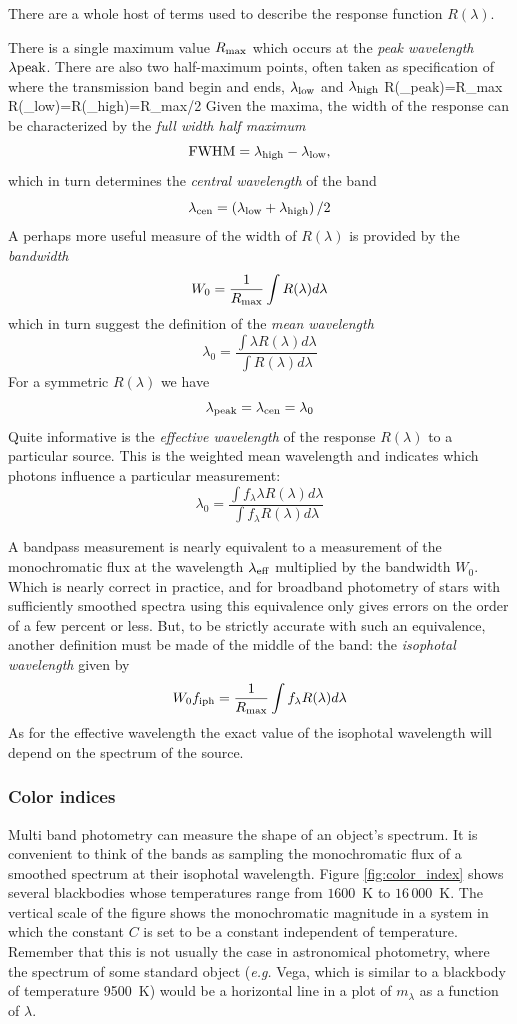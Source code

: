There are a whole host of terms used to describe the response
function $R(\lambda)$. 

There is a single maximum value $R_{\rm max}$  which occurs at the
{\it peak wavelength} $\lambda{\rm peak}$. There are also two
half-maximum points, often taken as specification of where the
transmission band begin and ends, $\lambda_{\rm low}$ and
$\lambda_{\rm high}$
\bua
R(\lambda_{\rm peak})=R_{\rm max} \\
R(\lambda_{\rm low})=R(\lambda_{\rm high})={R_{\rm max}/2}
\eua
Given the maxima, the width of the response can be characterized by
the {\it full width half maximum}
\[
{\rm FWHM}=\lambda_{\rm high}-\lambda_{\rm low},
\]
which in turn determines the {\it central wavelength} of the band
\[
\lambda_{\rm cen}={\left(\lambda_{\rm low}+\lambda_{\rm
      high}\right)/2}
\]
A perhaps more useful measure of the width of $R(\lambda)$ is provided
by the {\it bandwidth}
\[
W_0=\frac{1}{R_{\rm max}}\int R(\lambda)d\lambda
\]
which in turn suggest the definition of the {\it mean wavelength}
\[
\lambda_0=\frac{\int\lambda R(\lambda)d\lambda}{\int
  R(\lambda)d\lambda}
\]
For a symmetric $R(\lambda)$ we have
\[
\lambda_{\rm peak}=\lambda_{\rm cen}=\lambda_0
\]
Quite informative is the {\it effective wavelength} of the response
$R(\lambda)$ to a particular source. This is the weighted mean
wavelength and indicates which photons influence a particular
measurement:
\[
\lambda_0=\frac{\int f_\lambda\lambda R(\lambda)d\lambda}{\int
  f_\lambda R(\lambda)d\lambda}
\]

A bandpass measurement is nearly equivalent to a measurement of the
monochromatic flux at the wavelength $\lambda_{\rm eff}$ multiplied by
the bandwidth $W_0$. Which is nearly correct in practice, and for
broadband photometry of stars with sufficiently smoothed spectra using
this equivalence only gives errors on the order of a few percent or
less. But, to be strictly accurate with such an equivalence, another
definition must be made of the middle of the band: the {\it isophotal
  wavelength} given by
\[
W_0f_{\rm iph}=\frac{1}{R_{\rm max}}\int f_\lambda R(\lambda)d\lambda
\]
As for the effective wavelength the exact value of the isophotal
wavelength will depend on the spectrum of the source. 

\subsubsection{Color indices}

Multi band photometry can measure the shape of an object's
spectrum. It is convenient to think of the bands as sampling the
monochromatic flux of a smoothed spectrum at their isophotal
wavelength. Figure \ref{fig:color_index} shows several blackbodies
whose temperatures range from $1600$~K to $16\,000$~K. The vertical
scale of the figure shows the monochromatic magnitude in a system in
which the constant $C$ is set to be a constant independent of
temperature. Remember that this is not usually the case in
astronomical photometry, where the spectrum of some standard object
({\it e.g.} Vega, which is similar to a blackbody of temperature
9500~K) would be a horizontal line in a plot of $m_\lambda$ as a
function of $\lambda$. 

